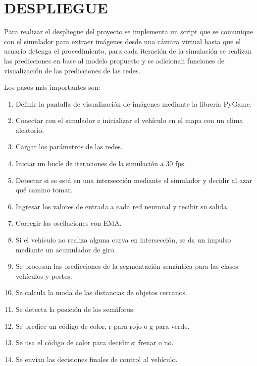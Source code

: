 \section{DESPLIEGUE}
	Para realizar el despliegue del proyecto se implementa un script que se comunique con el simulador para extraer imágenes desde una cámara virtual hasta que el usuario detenga el procedimiento, para cada iteración de la simulación se realizan las predicciones en base al modelo propuesto y se adicionan funciones de visualización de las predicciones de las redes.
	
	Los pasos más importantes son:
	\begin{enumerate}[nosep]
		\item Definir la pantalla de visualización de imágenes mediante la librería PyGame.
		\item Conectar con el simulador e inicializar el vehículo en el mapa con un clima aleatorio.
		\item Cargar los parámetros de las redes.
		\item Iniciar un bucle de iteraciones de la simulación a 30 fps.
		\item Detectar si se está en una intersección mediante el simulador y decidir al azar qué camino tomar.
		\item Ingresar los valores de entrada a cada red neuronal y recibir su salida.
		\item Corregir las oscilaciones con EMA.
		\item Si el vehículo no realiza alguna curva en intersección, se da un impulso mediante un acumulador de giro.
		\item Se procesan las predicciones de la segmentación semántica para las clases vehículos y postes.
		\item Se calcula la moda de las distancias de objetos cercanos.
		\item Se detecta la posición de los semáforos.
		\item Se predice un código de color, r para rojo o g para verde.
		\item Se usa el código de color para decidir si frenar o no.
		\item Se envían las decisiones finales de control al vehículo.
	\end{enumerate}
	
